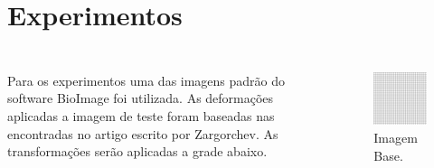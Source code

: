 \documentclass[t]{beamer}
\begin{document}
\section{Experimentos}
\subsection{}

\begin{frame}
   \begin{columns}[c]
Para os experimentos uma das imagens padrão do software BioImage\cite{papademetris2005bioimage} foi utilizada.
As deformações aplicadas a imagem de teste foram baseadas nas encontradas no artigo escrito por 
Zargorchev\cite{zagorchev2006comparative}.
        As transformações serão aplicadas a grade abaixo.
        \begin{figure}[!h]
          \begin{center}
            \includegraphics[width=1.0\textwidth]{../images/grid.png}
            \caption{Imagem Base.}
          \end{center}
        \end{figure}
    \end{columns}
\end{frame}
\end{document}
